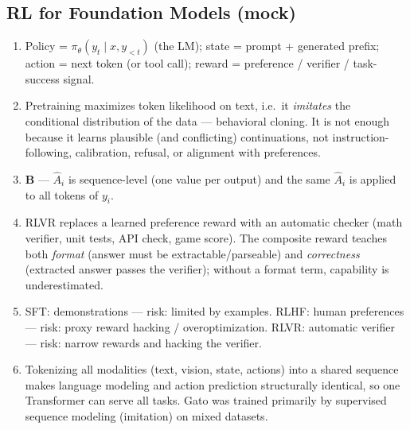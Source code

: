 \documentclass[11pt,oneside]{article}
\begin{document}
\subsection*{RL for Foundation Models (mock)}
\begin{enumerate}[label=\textbf{Q\arabic*.}, leftmargin=3em, itemsep=3pt, start=54]
  \item Policy = $\pi_\theta(y_t\mid x,y_{<t})$ (the LM); state = prompt + generated prefix; action = next token (or tool call); reward = preference / verifier / task-success signal.
  \item Pretraining maximizes token likelihood on text, i.e.\ it \emph{imitates} the conditional distribution of the data --- behavioral cloning. It is not enough because it learns plausible (and conflicting) continuations, not instruction-following, calibration, refusal, or alignment with preferences.
  \item \textbf{B} --- $\hat A_i$ is sequence-level (one value per output) and the same $\hat A_i$ is applied to all tokens of $y_i$.
  \item RLVR replaces a learned preference reward with an automatic checker (math verifier, unit tests, API check, game score). The composite reward teaches both \emph{format} (answer must be extractable/parseable) and \emph{correctness} (extracted answer passes the verifier); without a format term, capability is underestimated.
  \item SFT: demonstrations --- risk: limited by examples. RLHF: human preferences --- risk: proxy reward hacking / overoptimization. RLVR: automatic verifier --- risk: narrow rewards and hacking the verifier.
  \item Tokenizing all modalities (text, vision, state, actions) into a shared sequence makes language modeling and action prediction structurally identical, so one Transformer can serve all tasks. Gato was trained primarily by supervised sequence modeling (imitation) on mixed datasets.
\end{enumerate}
\end{document}
